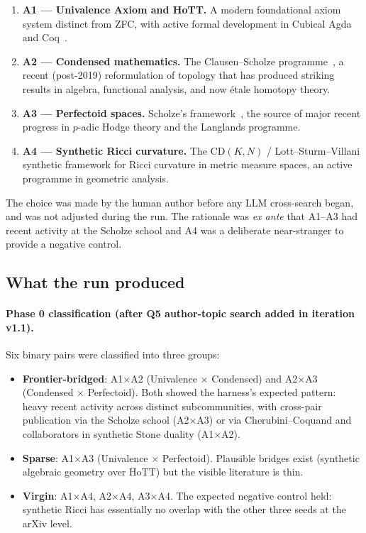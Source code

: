 \documentclass[11pt]{article}
\theoremstyle{definition}
\theoremstyle{remark}
\begin{document}
\begin{enumerate}
\item \textbf{A1 --- Univalence Axiom and HoTT.} A modern foundational
axiom system distinct from ZFC, with active formal development in
Cubical Agda and Coq~\cite{UniMath, Agda-cubical}.
\item \textbf{A2 --- Condensed mathematics.} The Clausen--Scholze
programme~\cite{ClausenScholze2019Lectures}, a recent (post-2019)
reformulation of topology that has produced striking results in
algebra, functional analysis, and now \'etale homotopy theory.
\item \textbf{A3 --- Perfectoid spaces.} Scholze's
framework~\cite{Scholze2012Perfectoid}, the source of major recent
progress in $p$-adic Hodge theory and the Langlands programme.
\item \textbf{A4 --- Synthetic Ricci curvature.} The CD$(K,N)$ /
Lott--Sturm--Villani synthetic framework for Ricci curvature in metric
measure spaces, an active programme in geometric analysis.
\end{enumerate}

The choice was made by the human author before any LLM cross-search
began, and was not adjusted during the run. The rationale was
\emph{ex ante} that A1--A3 had recent activity at the Scholze school
and A4 was a deliberate near-stranger to provide a negative control.

\subsection{What the run produced}

\paragraph{Phase 0 classification (after Q5 author-topic search added
in iteration v1.1).} Six binary pairs were classified into three
groups:

\begin{itemize}
\item \textbf{Frontier-bridged}: A1$\times$A2 (Univalence $\times$
Condensed) and A2$\times$A3 (Condensed $\times$ Perfectoid). Both showed
the harness's expected pattern: heavy recent activity across distinct
subcommunities, with cross-pair publication via the Scholze school
(A2$\times$A3) or via Cherubini--Coquand and collaborators in synthetic
Stone duality (A1$\times$A2).
\item \textbf{Sparse}: A1$\times$A3 (Univalence $\times$ Perfectoid).
Plausible bridges exist (synthetic algebraic geometry over HoTT) but
the visible literature is thin.
\item \textbf{Virgin}: A1$\times$A4, A2$\times$A4, A3$\times$A4. The
expected negative control held: synthetic Ricci has essentially no
overlap with the other three seeds at the arXiv level.
\end{itemize}
\end{document}
